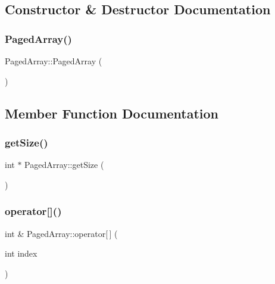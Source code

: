 \subsection{Constructor \& Destructor Documentation}
\mbox{\label{classPagedArray_a037f1ad3ec00a9ff2e5f28e5f9503e81}} 
\subsubsection{\texorpdfstring{Paged\+Array()}{PagedArray()}}
{\footnotesize\ttfamily Paged\+Array\+::\+Paged\+Array (\begin{DoxyParamCaption}{ }\end{DoxyParamCaption})}



\subsection{Member Function Documentation}
\mbox{\label{classPagedArray_a05b9be9fa91531a1228332186468513d}} 
\subsubsection{\texorpdfstring{get\+Size()}{getSize()}}
{\footnotesize\ttfamily int $\ast$ Paged\+Array\+::get\+Size (\begin{DoxyParamCaption}{ }\end{DoxyParamCaption})}

\mbox{\label{classPagedArray_a99778707be276b8a00d46e1acde5de2e}} 
\subsubsection{\texorpdfstring{operator[]()}{operator[]()}}
{\footnotesize\ttfamily int \& Paged\+Array\+::operator\mbox{[}$\,$\mbox{]} (\begin{DoxyParamCaption}\item[{int}]{index }\end{DoxyParamCaption})}

